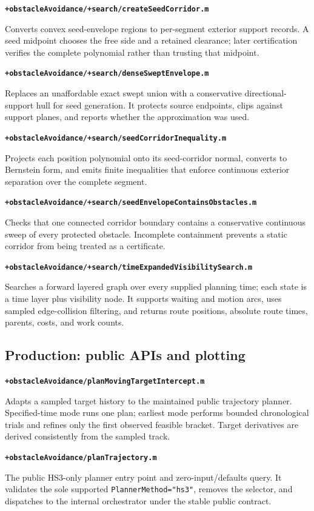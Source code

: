 \documentclass[10pt,letterpaper]{article}
\newcommand{\file}[1]{\nolinkurl{#1}}
\newcommand{\scriptentry}[2]{%
  \par\medskip\noindent\textbf{\file{#1}}\par
  \begingroup\raggedright #2\par\endgroup
}
\begin{document}
\scriptentry{+obstacleAvoidance/+search/createSeedCorridor.m}{Converts convex
seed-envelope regions to per-segment exterior support records. A seed midpoint
chooses the free side and a retained clearance; later certification verifies
the complete polynomial rather than trusting that midpoint.}

\scriptentry{+obstacleAvoidance/+search/denseSweptEnvelope.m}{Replaces an
unaffordable exact swept union with a conservative directional-support hull for
seed generation. It protects source endpoints, clips against support planes,
and reports whether the approximation was used.}

\scriptentry{+obstacleAvoidance/+search/seedCorridorInequality.m}{Projects each
position polynomial onto its seed-corridor normal, converts to Bernstein form,
and emits finite inequalities that enforce continuous exterior separation over
the complete segment.}

\scriptentry{+obstacleAvoidance/+search/seedEnvelopeContainsObstacles.m}{Checks
that one connected corridor boundary contains a conservative continuous sweep
of every protected obstacle. Incomplete containment prevents a static corridor
from being treated as a certificate.}

\scriptentry{+obstacleAvoidance/+search/timeExpandedVisibilitySearch.m}{Searches
a forward layered graph over every supplied planning time; each state is a time
layer plus visibility node. It supports waiting and motion arcs, uses sampled
edge-collision filtering, and returns route positions, absolute route times,
parents, costs, and work counts.}

\subsection{Production: public APIs and plotting}

\scriptentry{+obstacleAvoidance/planMovingTargetIntercept.m}{Adapts a sampled
target history to the maintained public trajectory planner. Specified-time mode
runs one plan; earliest mode performs bounded chronological trials and refines
only the first observed feasible bracket. Target derivatives are derived
consistently from the sampled track.}

\scriptentry{+obstacleAvoidance/planTrajectory.m}{The public HS3-only planner
entry point and zero-input/defaults query. It validates the sole supported
\file{PlannerMethod="hs3"}, removes the selector, and dispatches to the
internal orchestrator under the stable public contract.}
\end{document}
